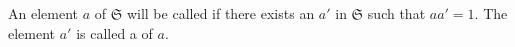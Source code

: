 An element $a$ of $\mathfrak{S}$ will be called  if there exists an $a'$ in $\mathfrak{S}$ such that $aa' = 1$. The element $a'$ is called a  of $a$.

